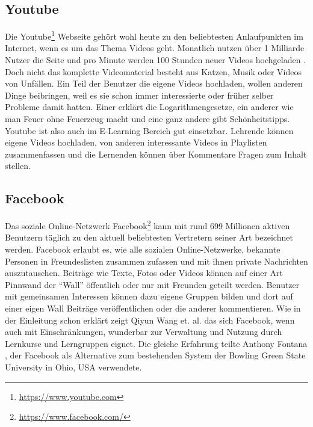 
\subsection{Youtube} %
\label{sub:youtube}

Die Youtube\footnote{\url{https://www.youtube.com}} Webseite gehört wohl heute zu den beliebtesten Anlaufpunkten im Internet, wenn es um das Thema Videos geht. Monatlich nutzen über 1 Milliarde Nutzer die Seite und pro Minute werden 100 Stunden neuer Videos hochgeladen \cite{youtube2013statistics}. Doch nicht das komplette Videomaterial besteht aus Katzen, Musik oder Videos von Unfällen. Ein Teil der Benutzer die eigene Videos hochladen, wollen anderen Dinge beibringen, weil es sie schon immer interessierte oder früher selber Probleme damit hatten. Einer erklärt die Logarithmengesetze, ein anderer wie man Feuer ohne Feuerzeug macht und eine ganz andere gibt Schönheitstipps. Youtube ist also auch im E-Learning Bereich gut einsetzbar. Lehrende können eigene Videos hochladen, von anderen interessante Videos in Playlisten zusammenfassen und die Lernenden können über Kommentare Fragen zum Inhalt stellen. 


\subsection{Facebook} %
\label{sub:facebook}

Das soziale Online-Netzwerk Facebook\footnote{\url{https://www.facebook.com/}} kann mit rund 699 Millionen aktiven Benutzern täglich \cite{Facebook2013} zu den aktuell beliebtesten Vertretern seiner Art bezeichnet werden. Facebook erlaubt es, wie alle sozialen Online-Netzwerke, bekannte Personen in Freundeslisten zusammen zufassen und mit ihnen private Nachrichten auszutauschen. Beiträge wie Texte, Fotos oder Videos können auf einer Art Pinnwand der \enquote{Wall} öffentlich oder nur mit Freunden geteilt werden. Benutzer mit gemeinsamen Interessen können dazu eigene Gruppen bilden und dort auf einer eigen Wall Beiträge veröffentlichen oder die anderer kommentieren. Wie in der Einleitung schon erklärt zeigt Qiyun Wang et. al. \cite{Wang2012} das sich Facebook, wenn auch mit Einschränkungen, wunderbar zur Verwaltung und Nutzung durch Lernkurse und Lerngruppen eignet. Die gleiche Erfahrung teilte Anthony Fontana \cite{Fontana2009,FacebookinEducarion2010}, der Facebook als Alternative zum bestehenden System der Bowling Green State University in Ohio, USA verwendete.

